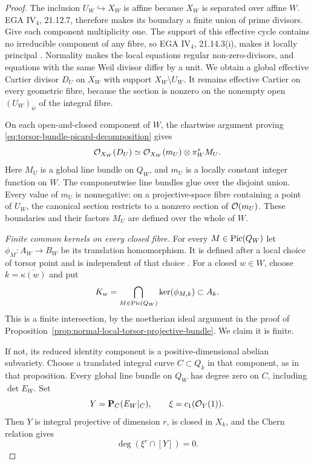 \begin{proof}
The inclusion $U_W\hookrightarrow X_W$ is affine because
$X_W$ is separated over affine $W$. EGA IV$_4$, 21.12.7,
therefore makes its boundary a finite union of prime divisors.
Give each component multiplicity one. The support of this
effective cycle contains no irreducible component of any
fibre, so EGA IV$_4$, 21.14.3(i), makes it locally principal
\cite{EGA}. Normality makes the local equations regular
non-zero-divisors, and equations with the same Weil divisor
differ by a unit. We obtain a global effective Cartier divisor
$D_U$ on $X_W$ with support $X_W\setminus U_W$.
It remains effective Cartier on every geometric fibre,
because the section is nonzero on the nonempty open
$(U_W)_{\bar w}$ of the integral fibre.

On each open-and-closed component of $W$, the chartwise
argument proving \eqref{eq:torsor-bundle-picard-decomposition} gives
\[
 \mathcal O_{X_W}(D_U)\simeq
 \mathcal O_{X_W}(m_U)\otimes\pi_W^*M_U.
\]
Here $M_U$ is a global line bundle on $Q_W$, and $m_U$ is a
locally constant integer function on $W$. The componentwise
line bundles glue over the disjoint union. Every value of
$m_U$ is nonnegative: on a projective-space fibre containing
a point of $U_W$, the canonical section restricts to a nonzero
section of $\mathcal O(m_U)$. These boundaries and their factors
$M_U$ are defined over the whole of $W$.

\emph{Finite common kernels on every closed fibre.}
For every $M\in\operatorname{Pic}(Q_W)$ let
$\phi_M:A_W\to B_W$ be its translation homomorphism.
It is defined after a local choice of torsor point and is
independent of that choice \cite[\S3.6]{PR}.
For a closed $w\in W$, choose
$k=\overline{\kappa(w)}$ and put
\[
 K_w=\bigcap_{M\in\operatorname{Pic}(Q_W)}\ker(\phi_{M,k})\subset A_k.
\]
This is a finite intersection, by the noetherian ideal argument
in the proof of
Proposition~\ref{prop:normal-local-torsor-projective-bundle}.
We claim it is finite.

If not, its reduced identity component is a positive-dimensional
abelian subvariety. Choose a translated integral curve
$C\subset Q_k$ in that component, as in that proposition.
Every global line bundle on $Q_W$ has degree zero on $C$,
including $\det E_W$. Set
\[
 Y=\mathbf P_C(E_W|_C),\qquad \xi=c_1(\mathcal O_Y(1)).
\]
Then $Y$ is integral projective of dimension $r$, is closed
in $X_k$, and the Chern relation gives
\[
 \deg(\xi^r\cap[Y])=0.
\]


\end{proof}
